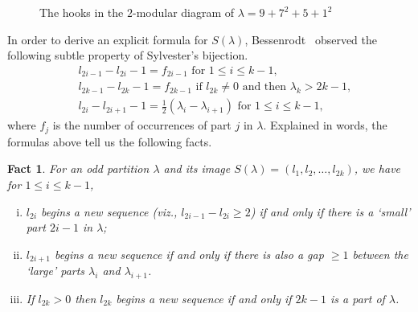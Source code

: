 \documentclass[11pt,reqno]{amsart}
\numberwithin{equation}{section}
\theoremstyle{plain}
\newtheorem{Fact}[theorem]{Fact}
\theoremstyle{definition}
\theoremstyle{named}
\def\la{\lambda}
\begin{document}
\begin{figure}[ht]
\begin{ferrers}

\addtext{1.5}{-3}{$[\la]_2$}



\end{ferrers}
\caption{The hooks in the $2$-modular diagram of $\lambda=9+7^2+5+1^2$}
\label{fig:hook}
\end{figure}

In order to derive an explicit formula for $S(\la)$, Bessenrodt~\cite[pp.~6]{bes94} observed the following subtle property of Sylvester's bijection.
\begin{align*}
& l_{2i-1}-l_{2i}-1=f_{2i-1} \text{ for $1\le i\le k-1$,}\\
& l_{2k-1}-l_{2k}-1=f_{2k-1} \text{ if $l_{2k}\neq 0$ and then $\la_k>2k-1$,}\\
& l_{2i}-l_{2i+1}-1=\frac{1}{2}(\la_i-\la_{i+1}) \text{ for $1\le i\le k-1$,}
\end{align*}
where $f_j$ is the number of occurrences of part $j$ in $\la$. Explained in words, the formulas above tell us the following facts.
\begin{Fact} \label{fact:seq}
For an odd partition $\la$ and its image $S(\la)=(l_1,l_2,\ldots,l_{2k})$, we have for $1\le i\le k-1$,
\begin{enumerate}[(i)]
	\item $l_{2i}$ begins a new sequence (viz., $l_{2i-1}-l_{2i}\ge 2$) if and only if there is a `small' part $2i-1$ in $\la$;
	\item $l_{2i+1}$ begins a new sequence if and only if there is also a gap $\ge 1$ between the `large' parts $\la_i$ and $\la_{i+1}$.
	\item If $l_{2k}>0$ then $l_{2k}$ begins a new sequence if and only if $2k-1$ is a part of $\la$.
\end{enumerate}
\end{Fact}
\end{document}
